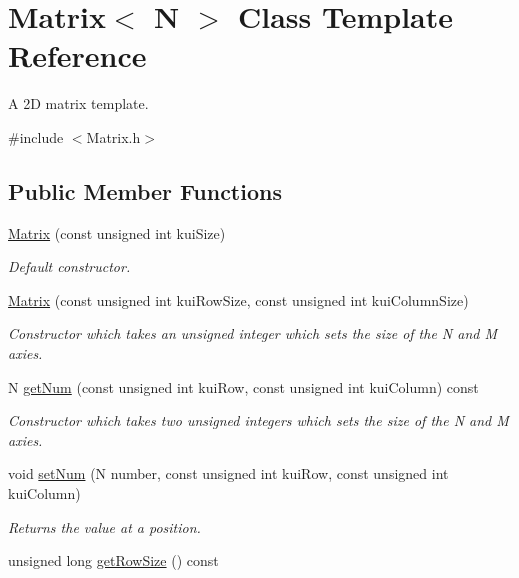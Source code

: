 \hypertarget{class_matrix}{\section{Matrix$<$ N $>$ Class Template Reference}
\label{class_matrix}
}


A 2\+D matrix template.  




{\ttfamily \#include $<$Matrix.\+h$>$}

\subsection*{Public Member Functions}
\begin{DoxyCompactItemize}
\item 
\hyperlink{class_matrix_aad1599c87ef31d073c2bb38d9ef955b6}{Matrix} (const unsigned int kui\+Size)
\begin{DoxyCompactList}\small\item\em Default constructor. \end{DoxyCompactList}\item 
\hyperlink{class_matrix_aac2bcab1b31e9521c361c56aa4ae00f6}{Matrix} (const unsigned int kui\+Row\+Size, const unsigned int kui\+Column\+Size)
\begin{DoxyCompactList}\small\item\em Constructor which takes an unsigned integer which sets the size of the N and M axies. \end{DoxyCompactList}\item 
N \hyperlink{class_matrix_ac91fbcc1cace5ea4c67252e798a942ba}{get\+Num} (const unsigned int kui\+Row, const unsigned int kui\+Column) const 
\begin{DoxyCompactList}\small\item\em Constructor which takes two unsigned integers which sets the size of the N and M axies. \end{DoxyCompactList}\item 
void \hyperlink{class_matrix_a841bb352aabe6b8d5492324eaa6b63c6}{set\+Num} (N number, const unsigned int kui\+Row, const unsigned int kui\+Column)
\begin{DoxyCompactList}\small\item\em Returns the value at a position. \end{DoxyCompactList}\item 
\hypertarget{class_matrix_aa7f14b67329eb92cac86797dc6a2be2c}{unsigned long \hyperlink{class_matrix_aa7f14b67329eb92cac86797dc6a2be2c}{get\+Row\+Size} () const }\label{class_matrix_aa7f14b67329eb92cac86797dc6a2be2c}


\end{DoxyCompactItemize}
